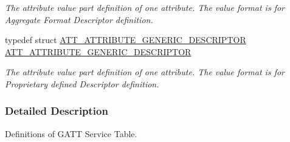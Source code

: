 \begin{DoxyCompactItemize}
\begin{DoxyCompactList}\small\item\em The attribute value part definition of one attribute. The value format is for Aggregate Format Descriptor definition. \end{DoxyCompactList}\item 
typedef struct \hyperlink{struct_a_t_t___a_t_t_r_i_b_u_t_e___g_e_n_e_r_i_c___d_e_s_c_r_i_p_t_o_r}{A\+T\+T\+\_\+\+A\+T\+T\+R\+I\+B\+U\+T\+E\+\_\+\+G\+E\+N\+E\+R\+I\+C\+\_\+\+D\+E\+S\+C\+R\+I\+P\+T\+OR} \hyperlink{group___b_l_e___g_a_t_t___s_e_r_v_i_c_e___t_a_b_l_e_gacac95a7f936857711bad09a2d545c713}{A\+T\+T\+\_\+\+A\+T\+T\+R\+I\+B\+U\+T\+E\+\_\+\+G\+E\+N\+E\+R\+I\+C\+\_\+\+D\+E\+S\+C\+R\+I\+P\+T\+OR}\hypertarget{group___b_l_e___g_a_t_t___s_e_r_v_i_c_e___t_a_b_l_e_gacac95a7f936857711bad09a2d545c713}{}\label{group___b_l_e___g_a_t_t___s_e_r_v_i_c_e___t_a_b_l_e_gacac95a7f936857711bad09a2d545c713}

\begin{DoxyCompactList}\small\item\em The attribute value part definition of one attribute. The value format is for Proprietary defined Descriptor definition. \end{DoxyCompactList}\end{DoxyCompactItemize}


\subsubsection{Detailed Description}
Definitions of G\+A\+TT Service Table. 


